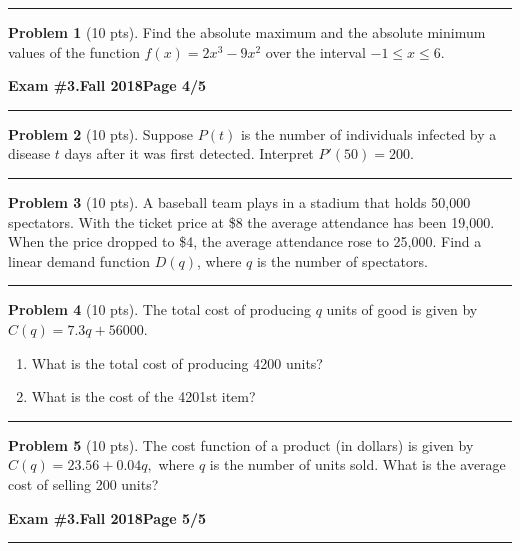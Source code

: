\documentclass[12pt]{article}
\theoremstyle{definition}
\newtheorem{problem}{Problem}
\begin{document}
\hrule
\begin{problem}[10 pts]
Find the absolute maximum and the absolute minimum values of the function $f(x) = 2x^3 - 9x^2$ over the interval $-1 \leq x \leq 6$.
\end{problem}
\newpage

\hfill{\large\bf Exam \#3.}\hfill{\large\bf Fall 2018}\hfill{\large\bf Page 4/5}\hrule

\bigskip
\begin{problem}[10 pts]
  Suppose $P(t)$ is the number of individuals infected by a disease $t$ days after it was first detected. Interpret $P'(50)=200.$
\end{problem}
\vspace{2cm}
\hrule

\begin{problem}[10 pts]
  A baseball team plays in a stadium that holds 50,000 spectators.  With the ticket price at \$8 the average attendance
  has been 19,000.  When the price dropped to \$4, the average attendance rose to 25,000.  Find a linear demand function
  $D(q)$, where $q$ is the number of spectators.
\end{problem}
\vspace{4cm}
\hrule

\begin{problem}[10 pts]
  The total cost of producing $q$ units of good is given by $C(q) = 7.3q + 56000.$
  \begin{enumerate}
  \item What is the total cost of producing 4200 units?
    \vspace{2cm}
  \item What is the cost of the 4201st item?
  \end{enumerate}
  \vspace{2cm}
\end{problem}

\hrule
\begin{problem}[10 pts]
  The cost function of a product (in dollars) is given by $C(q) = 23.56 + 0.04q,$ where $q$ is the number of units
  sold.  What is the average cost of selling 200 units?
\end{problem}

\newpage

\hfill{\large\bf Exam \#3.}\hfill{\large\bf Fall 2018}\hfill{\large\bf Page 5/5}\hrule
\end{document}
